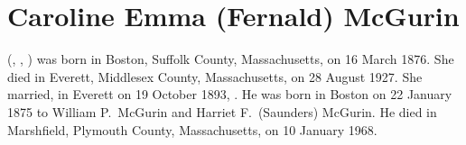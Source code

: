 \section{Caroline Emma (Fernald) McGurin}\label{per:Caroline4Fernald}

 (, , ) was born in Boston, Suffolk County, Massachusetts, on 16 March 1876.\cite{Caroline4FernaldBirth} She died in Everett, Middlesex County, Massachusetts, on 28 August 1927.\cite{Caroline4FernaldDeath} She married, in Everett on 19 October 1893, . He was born in Boston on 22 January 1875 to William P.\ McGurin and Harriet F.\ (Saunders) McGurin.\cite{JohnMcGurinBirth} He died in Marshfield, Plymouth County, Massachusetts, on 10 January 1968.\cite{JohnMcGurinDeath}

